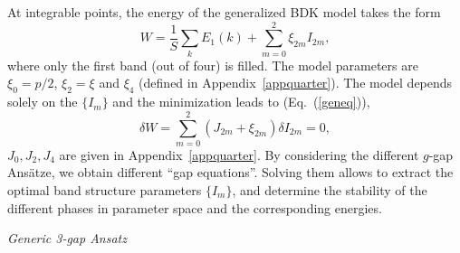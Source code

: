 \documentclass[]{revtex4-1}
\begin{document}
At integrable points, the energy of the generalized BDK model takes the form
\begin{equation}
W= \frac{1}{S} \sum_{k} E_1(k) + \sum_{m=0}^2 \xi_{2m} I_{2m},
\end{equation}
where only the first band (out of four) is filled. The model parameters are $\xi_0=p/2$, $\xi_2=\xi$ and $\xi_4$ (defined in Appendix~\ref{appquarter}).
The model depends solely on the $\{I_m\}$ and the minimization leads to (Eq.~(\ref{geneq})),
\begin{equation}
\delta W=  \sum_{m=0}^2 (J_{2m}+\xi_{2m})\delta I_{2m}=0,
\label{minN4eq0} \end{equation}
$J_0,J_2,J_4$ are given in Appendix~\ref{appquarter}.
By considering the different $g$-gap Ans\"atze, we obtain different ``gap equations''. Solving them allows to extract the optimal band structure parameters $\{I_m\}$, and determine the stability of the different phases in parameter space and  the corresponding energies.

\medskip

\textit{Generic 3-gap Ansatz}

\medskip
\end{document}
